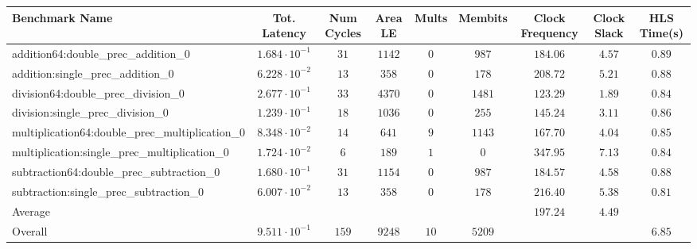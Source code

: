 \begin{tabular}{|l|c|c|c|c|c|c|c|c|}
\hline
Benchmark Name                                   & Tot. Latency            & Num Cycles & Area LE  & Mults  & Membits  & Clock Frequency & Clock Slack & HLS Time(s) \\
\hline
addition64:double\_prec\_addition\_0             & $ 1.684 \cdot 10^{-1} $ & $ 31     $ & $ 1142 $ & $ 0  $ & $ 987  $ & $ 184.06      $ & $ 4.57    $ & $ 0.89    $ \\
addition:single\_prec\_addition\_0               & $ 6.228 \cdot 10^{-2} $ & $ 13     $ & $ 358  $ & $ 0  $ & $ 178  $ & $ 208.72      $ & $ 5.21    $ & $ 0.88    $ \\
division64:double\_prec\_division\_0             & $ 2.677 \cdot 10^{-1} $ & $ 33     $ & $ 4370 $ & $ 0  $ & $ 1481 $ & $ 123.29      $ & $ 1.89    $ & $ 0.84    $ \\
division:single\_prec\_division\_0               & $ 1.239 \cdot 10^{-1} $ & $ 18     $ & $ 1036 $ & $ 0  $ & $ 255  $ & $ 145.24      $ & $ 3.11    $ & $ 0.86    $ \\
multiplication64:double\_prec\_multiplication\_0 & $ 8.348 \cdot 10^{-2} $ & $ 14     $ & $ 641  $ & $ 9  $ & $ 1143 $ & $ 167.70      $ & $ 4.04    $ & $ 0.85    $ \\
multiplication:single\_prec\_multiplication\_0   & $ 1.724 \cdot 10^{-2} $ & $ 6      $ & $ 189  $ & $ 1  $ & $ 0    $ & $ 347.95      $ & $ 7.13    $ & $ 0.84    $ \\
subtraction64:double\_prec\_subtraction\_0       & $ 1.680 \cdot 10^{-1} $ & $ 31     $ & $ 1154 $ & $ 0  $ & $ 987  $ & $ 184.57      $ & $ 4.58    $ & $ 0.88    $ \\
subtraction:single\_prec\_subtraction\_0         & $ 6.007 \cdot 10^{-2} $ & $ 13     $ & $ 358  $ & $ 0  $ & $ 178  $ & $ 216.40      $ & $ 5.38    $ & $ 0.81    $ \\
\hline
Average                                          & $                     $ & $        $ & $      $ & $    $ & $      $ & $ 197.24      $ & $ 4.49    $ & $         $ \\
\hline
Overall                                          & $ 9.511 \cdot 10^{-1} $ & $ 159    $ & $ 9248 $ & $ 10 $ & $ 5209 $ & $             $ & $         $ & $ 6.85    $ \\
\hline
\end{tabular}
